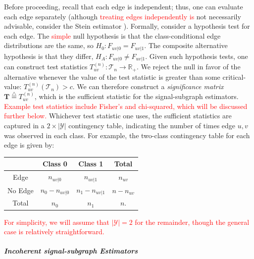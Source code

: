 \documentclass[10pt,journal,cspaper,compsoc]{IEEEtran}
\providecommand{\tr}[1]{\textcolor{red}{#1}}
\providecommand{\mc}[1]{\mathcal{#1}}
\providecommand{\mb}[1]{\boldsymbol{#1}}
\newcommand{\Real}{\mathbb{R}}
\newcommand{\defeq}{\overset{\triangle}{=}}
\begin{document}
Before proceeding, recall that each edge is independent; thus, one can evaluate each edge separately (although \tr{treating edges independently is} not necessarily advisable, consider the Stein estimator \cite{Stein1956}).  Formally, consider a hypothesis test for each edge.  The \tr{simple} null hypothesis is that the class-conditional edge distributions are the same, so $H_0: F_{uv|0}=F_{uv|1}$.  The composite alternative hypothesis is that they differ, $H_A: F_{uv|0} \neq F_{uv|1}$.  Given such hypothesis tests, one can construct test statistics $T_{uv}^{(n)}: \mc{T}_n \to \Real_+$.  We reject the null in favor of the alternative whenever the value of the test statistic is greater than some critical-value: $T_{uv}^{(n)}(\mc{T}_n)>c$.  We can therefore construct a \emph{significance matrix} $\mb{T} \defeq T_{uv}^{(n)}$, which is the sufficient statistic for the signal-subgraph estimators. %
\tr{Example test statistics include Fisher's and chi-squared, which will be discussed further below.}
Whichever test statistic one uses, the sufficient statistics are captured in a $2 \times |\mc{Y}|$  contingency table, indicating the number of times edge $u,v$ was observed in each class.  For example, the two-class contingency table for each edge is given by:  
% 
\begin{table}[h!]
\begin{center}
\begin{tabular}{c||c|c||c}
 & Class 0  & Class 1 & Total \\
\hline\hline
Edge & $n_{uv|0}$ & $n_{uv|1}$ & $n_{uv}$ \\ \hline
No Edge & $n_0-n_{uv|0}$ & $n_1-n_{uv|1}$ & $n-n_{uv}$ \\ \hline \hline
Total & $n_0$ & $n_1$ & $n$. %
\end{tabular}
\end{center}
\label{tab:contingency}
\end{table}%

\tr{For simplicity, we will assume that $|\mc{Y}|=2$ for the remainder, though the general case is  relatively straightforward.}

\paragraph{\emph{Incoherent signal-subgraph Estimators}} %
\label{par:paragraph_name}
\end{document}
